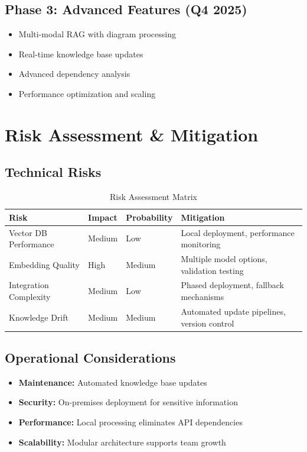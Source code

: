\documentclass[11pt,letterpaper]{article}
\begin{document}
\subsection{Phase 3: Advanced Features (Q4 2025)}
\begin{itemize}[leftmargin=20pt]
    \item Multi-modal RAG with diagram processing
    \item Real-time knowledge base updates
    \item Advanced dependency analysis
    \item Performance optimization and scaling
\end{itemize}

\section{Risk Assessment \& Mitigation}

\subsection{Technical Risks}
\begin{table}[h!]
\centering
\begin{tabularx}{\textwidth}{|l|X|l|X|}
\hline
\textbf{Risk} & \textbf{Impact} & \textbf{Probability} & \textbf{Mitigation} \\
\hline
Vector DB Performance & Medium & Low & Local deployment, performance monitoring \\
\hline
Embedding Quality & High & Medium & Multiple model options, validation testing \\
\hline
Integration Complexity & Medium & Low & Phased deployment, fallback mechanisms \\
\hline
Knowledge Drift & Medium & Medium & Automated update pipelines, version control \\
\hline
\end{tabularx}
\caption{Risk Assessment Matrix}
\end{table}

\subsection{Operational Considerations}
\begin{itemize}
    \item \textbf{Maintenance:} Automated knowledge base updates
    \item \textbf{Security:} On-premises deployment for sensitive information
    \item \textbf{Performance:} Local processing eliminates API dependencies
    \item \textbf{Scalability:} Modular architecture supports team growth
\end{itemize}
\end{document}
